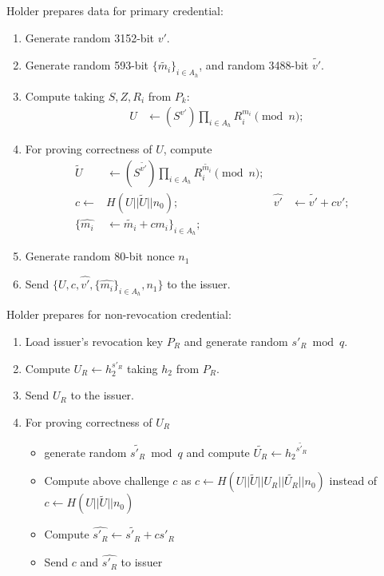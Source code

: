 Holder prepares data for primary credential:
\begin{enumerate}
\item Generate random 3152-bit $v'$.
\item Generate random 593-bit $\{\widetilde{m_i}
\}_{i \in A_h}$, and random 3488-bit $\widetilde{v'}$.
\item Compute taking $S,Z,R_i$ from $P_k$:
\begin{align}
U& \leftarrow (S^{v'}) \prod_{i \in A_h}{R_i^{m_i}} \pmod{n};
\end{align}
\item For proving correctness of $U$, compute
\begin{align}
\widetilde{U}&\leftarrow (S^{\widetilde{v'}}) \prod_{i \in A_h}{R_i^{\widetilde{m_i}}}\pmod{n};
&%
\\
c\leftarrow& H(U||\widetilde{U}||
n_0);&
\widehat{v'}&\leftarrow \widetilde{v'} + c v';&\\
\{\widehat{m_i}&\leftarrow \widetilde{m_i} + c m_i\}_{i \in A_h};&
\end{align}
\item Generate random 80-bit nonce $n_1$
\item Send $
\{U, c,\widehat{v'}, \{
\widehat{m_i}
\}_{i \in A_h}, n_1\}$ to the issuer.
\end{enumerate}
Holder prepares for non-revocation credential:
\begin{enumerate}
    \item Load issuer's revocation key $P_R$ and generate random $s'_R\bmod{q}$.
     \item Compute $U_R \leftarrow h_2^{s'_R}$
    taking $h_2$ from $P_R$.
    \item Send $U_R$ to the issuer.
    \item For proving correctness of $U_R$
    \begin{itemize}
    \item generate random $\widetilde{s'_R}\bmod{q}$ and compute $\widetilde{U_R} \leftarrow {h_2}^{\widetilde{s'_R}}$
    \item Compute above challenge $c$ as $c\leftarrow H(U||\widetilde{U}||U_R||\widetilde{U_R}||n_0)$ instead of $c\leftarrow H(U||\widetilde{U}||n_0)$
    \item Compute $\widehat{s'_R}\leftarrow \widetilde{s'_R} + c s'_R$
    \item Send $c$ and $\widehat{s'_R}$ to issuer
    \end{itemize}
\end{enumerate}



